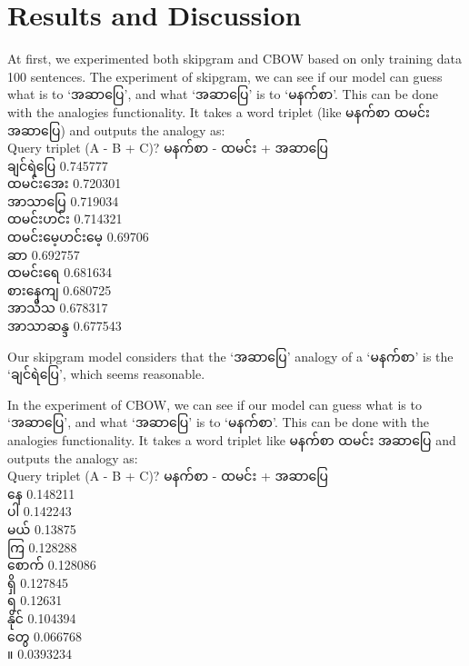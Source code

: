 \documentclass[conference]{IEEEtran}
\begin{document}
\section {Results and Discussion}
\label{sec:ResultsandDiscussion}
At first, we experimented both skipgram and CBOW based on only training data 100 sentences. The experiment of skipgram,  we can see if our model can guess what is to `{\padauktext အဆာပြေ}', and what `{\padauktext အဆာပြေ}' is to `{\padauktext မနက်စာ}'. This can be done with the analogies functionality. It takes a word triplet (like {\padauktext မနက်စာ  ထမင်း အဆာပြေ}) and outputs the analogy as:\\

\begingroup
Query triplet (A - B + C)? {\padauktext မနက်စာ - ထမင်း + အဆာပြေ }\\
{\padauktext ချင်ရဲပြေ} 0.745777\\
{\padauktext ထမင်းအေး} 0.720301\\
{\padauktext အာသာပြေ} 0.719034\\
{\padauktext ထမင်းဟင်း} 0.714321\\
{\padauktext ထမင်းမေ့ဟင်းမေ့} 0.69706\\
{\padauktext ဆာ} 0.692757\\
{\padauktext ထမင်းရေ} 0.681634\\
{\padauktext စားနေကျ} 0.680725\\
{\padauktext အာသီသ} 0.678317\\
{\padauktext အာသာဆန္ဒ} 0.677543\\\endgroup

Our skipgram model considers that the `{\padauktext အဆာပြေ}' analogy of a `{\padauktext မနက်စာ}' is the `{\padauktext ချင်ရဲပြေ}', which seems reasonable. 

In the experiment of CBOW,  we can see if our model can guess what is to `{\padauktext အဆာပြေ}', and what `{\padauktext အဆာပြေ}' is to `{\padauktext မနက်စာ}'. This can be done with the analogies functionality. It takes a word triplet like {\padauktext မနက်စာ  ထမင်း အဆာပြေ} and outputs the analogy as:\\

\begingroup
Query triplet (A - B + C)? {\padauktext မနက်စာ - ထမင်း + အဆာပြေ }\\
{\padauktext နေ} 0.148211\\
{\padauktext ပါ} 0.142243\\
{\padauktext မယ်} 0.13875\\
{\padauktext ကြ} 0.128288\\
{\padauktext စောက်} 0.128086\\
{\padauktext ရှိ} 0.127845\\
{\padauktext ရ} 0.12631\\
{\padauktext နိုင်} 0.104394\\
{\padauktext တွေ} 0.066768\\
{\padauktext ။} 0.0393234\\\endgroup
\end{document}
